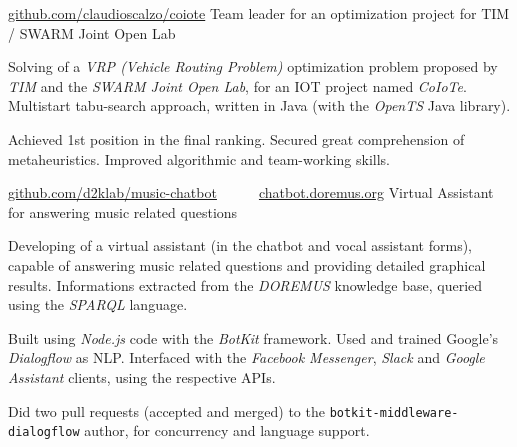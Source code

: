 



\begin{cventries}

	\cvproj
		{\href{https://github.com/claudioscalzo/coiote}{github.com/claudioscalzo/coiote}}
		{Team leader for an optimization project for TIM / SWARM Joint Open Lab}
		{}
		{}
		{
			\begin{cvitems} %
				\item {Solving of a \textit{VRP (Vehicle Routing Problem)} optimization problem proposed by \textit{TIM} and the \textit{SWARM Joint Open Lab}, for an IOT project named \textit{CoIoTe}. Multistart tabu-search approach, written in Java (with the \textit{OpenTS} Java library).}
				\item {Achieved 1st position in the final ranking. Secured great comprehension of metaheuristics. Improved algorithmic and team-working skills.}
			\end{cvitems}
		}

	\cvproj
		{\href{https://github.com/D2KLab/music-chatbot}{github.com/d2klab/music-chatbot}~~~\textbullet~~~\href{https://chatbot.doremus.org}{chatbot.doremus.org}}
		{Virtual Assistant for answering music related questions}
		{}
		{}
		{
			\begin{cvitems} %
				\item {Developing of a virtual assistant (in the chatbot and vocal assistant forms), capable of answering music related questions and providing detailed graphical results. Informations extracted from the \textit{DOREMUS} knowledge base, queried using the \textit{SPARQL} language.}
				\item {Built using \textit{Node.js} code with the \textit{BotKit} framework. Used and trained Google's \textit{Dialogflow} as NLP. Interfaced with the \textit{Facebook Messenger}, \textit{Slack} and \textit{Google Assistant} clients, using the respective APIs.}
				\item {Did two pull requests (accepted and merged) to the \texttt{botkit-middleware-dialogflow} author, for concurrency and language support.}
			\end{cvitems}
		}
	

\end{cventries}
